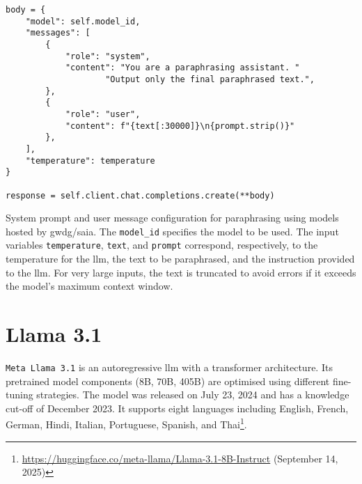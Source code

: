 \begin{listing}[H]
\centering
\begin{verbatim}
body = {
    "model": self.model_id,
    "messages": [
        {
            "role": "system",
            "content": "You are a paraphrasing assistant. "
                    "Output only the final paraphrased text.",
        },
        {
            "role": "user",
            "content": f"{text[:30000]}\n{prompt.strip()}"
        },
    ],
    "temperature": temperature
}

response = self.client.chat.completions.create(**body)
\end{verbatim}
\caption{
System prompt and user message configuration for paraphrasing using models hosted by \ac{gwdg}/\ac{saia}. 
The \texttt{model\_id} specifies the model to be used. 
The input variables \texttt{temperature}, \texttt{text}, and \texttt{prompt} correspond, respectively, to the temperature for the \ac{llm}, the text to be paraphrased, and the instruction provided to the \ac{llm}.
For very large inputs, the text is truncated to avoid errors if it exceeds the model’s maximum context window.
}
\label{lst:paraphrase_prompt}
\end{listing}



\section{Llama 3.1}

\texttt{Meta Llama 3.1} is an autoregressive \ac{llm} with a transformer architecture.
Its pretrained model components  (8B, 70B, 405B) are optimised using different fine-tuning strategies.
The model was released on July 23, 2024 and has a knowledge cut-off of December 2023.
It supports eight languages including English, French, German, Hindi, Italian, Portuguese, Spanish, and Thai\footnote{\url{https://huggingface.co/meta-llama/Llama-3.1-8B-Instruct} (September 14, 2025)}.



